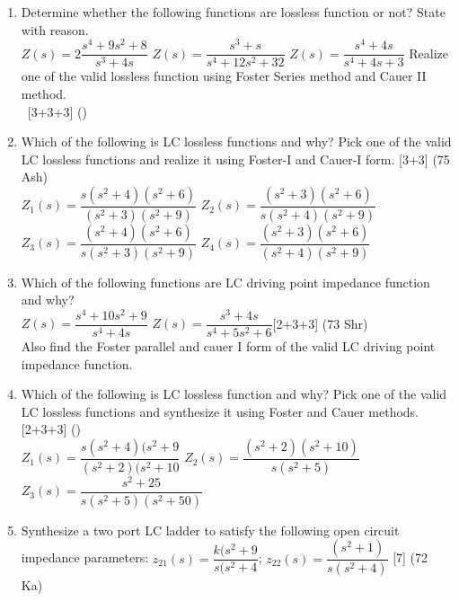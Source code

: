 \documentclass[12pt]{article}
\newcommand{\enter}{\\\textcolor{white}{1}}
\begin{document}
\begin{enumerate}
	\item Determine whether the following functions are lossless function or not? State with reason. \\
	$Z(s) = 2\dfrac{s^4+9s^2+8}{s^3+4s}$ \hspace{2cm}
	$Z(s) = \dfrac{s^3+s}{s^4+12s^2+32}$ \hspace{2cm}
	$Z(s) = \dfrac{s^4+4s}{s^4+4s+3}$
	Realize one of the valid lossless function using Foster Series method and Cauer II method.
	\enter\hfill [3+3+3] ()
	
	\item Which of the following is LC lossless functions and why? Pick one of the valid LC lossless functions and realize it using Foster-I and Cauer-I form. \hfill [3+3] (75 Ash)\\
	$Z_1(s) = \dfrac{s(s^2+4)(s^2+6)}{(s^2+3)(s^2+9)}$ \hspace{2cm}
	$Z_2(s) = \dfrac{(s^2+3)(s^2+6)}{s(s^2+4)(s^2+9)}$ \\
	$Z_3(s) = \dfrac{(s^2+4)(s^2+6)}{s(s^2+3)(s^2+9)}$ \hspace{2cm}
	$Z_4(s) = \dfrac{(s^2+3)(s^2+6)}{(s^2+4)(s^2+9)}$
	
	\item Which of the following functions are LC driving point impedance function and why?\\
	$Z(s) = \dfrac{s^4+10s^2+9}{s^4+4s}$ \hspace{2cm}
	$Z(s) = \dfrac{s^3+4s}{s^4+5s^2+6}$\hfill [2+3+3] (73 Shr)\\
	Also find the Foster parallel and cauer I form of the valid LC driving point impedance function.
	
	\item Which of the following is LC lossless function and why? Pick one of the valid LC lossless functions and synthesize it using Foster and Cauer methods. \hfill [2+3+3] ()\\
	$Z_1(s)=\dfrac{s(s^2+4)(s^2+9}{(s^2+2)(s^2+10}$ \hspace{2cm}
	$Z_2(s)=\dfrac{(s^2+2)(s^2+10)}{s(s^2+5)}$ \hspace{2cm}
	$Z_3(s)=\dfrac{s^2+25}{s(s^2+5)(s^2+50)}$
	
	\item Synthesize a two port LC ladder to satisfy the following open circuit impedance parameters: $z_{21}(s) = \dfrac{k(s^2+9}{s(s^2+4}$; $z_{22}(s) = \dfrac{(s^2+1)}{s(s^2+4)}$ \hfill [7] (72 Ka)
\end{enumerate}
\end{document}
